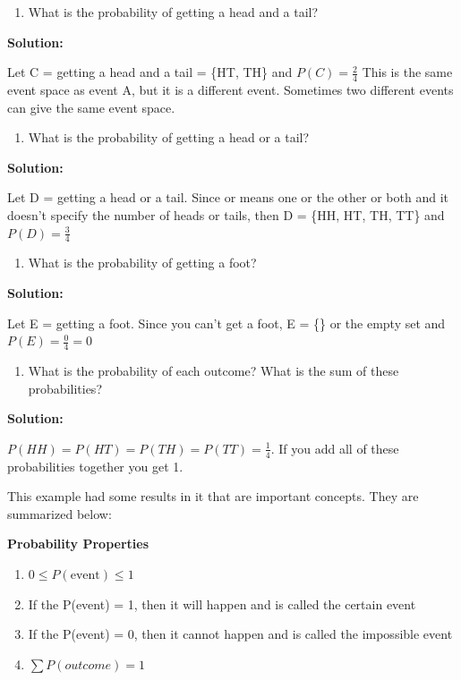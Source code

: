 \documentclass[
]{book}
\providecommand{\tightlist}{%
  \setlength{\itemsep}{0pt}\setlength{\parskip}{0pt}}
\begin{document}
\begin{enumerate}
\def\labelenumi{\alph{enumi}.}
\setcounter{enumi}{3}
\tightlist
\item
  What is the probability of getting a head and a tail?
\end{enumerate}

\textbf{Solution:}

Let C = getting a head and a tail = \{HT, TH\} and \(P(C)=\frac{2}{4}\) This is the same event space as event A, but it is a different event. Sometimes two different events can give the same event space.

\begin{enumerate}
\def\labelenumi{\alph{enumi}.}
\setcounter{enumi}{4}
\tightlist
\item
  What is the probability of getting a head or a tail?
\end{enumerate}

\textbf{Solution:}

Let D = getting a head or a tail. Since or means one or the other or both and it doesn't specify the number of heads or tails, then D = \{HH, HT, TH, TT\} and \(P(D)=\frac{3}{4}\)

\begin{enumerate}
\def\labelenumi{\alph{enumi}.}
\setcounter{enumi}{5}
\tightlist
\item
  What is the probability of getting a foot?
\end{enumerate}

\textbf{Solution:}

Let E = getting a foot. Since you can't get a foot, E = \{\} or the empty set and \(P(E)=\frac{0}{4}=0\)

\begin{enumerate}
\def\labelenumi{\alph{enumi}.}
\setcounter{enumi}{6}
\tightlist
\item
  What is the probability of each outcome? What is the sum of these probabilities?
\end{enumerate}

\textbf{Solution:}

\(P(HH)=P(HT)=P(TH)=P(TT)=\frac{1}{4}\). If you add all of these probabilities together you get 1.

This example had some results in it that are important concepts. They are summarized below:

\textbf{Probability Properties}

\begin{enumerate}
\def\labelenumi{\arabic{enumi}.}
\tightlist
\item
  \(0 \le P(\text{event}) \le 1\)
\item
  If the P(event) = 1, then it will happen and is called the certain event
\item
  If the P(event) = 0, then it cannot happen and is called the impossible event
\item
  \(\sum{P(outcome)}=1\)
\end{enumerate}
\end{document}
